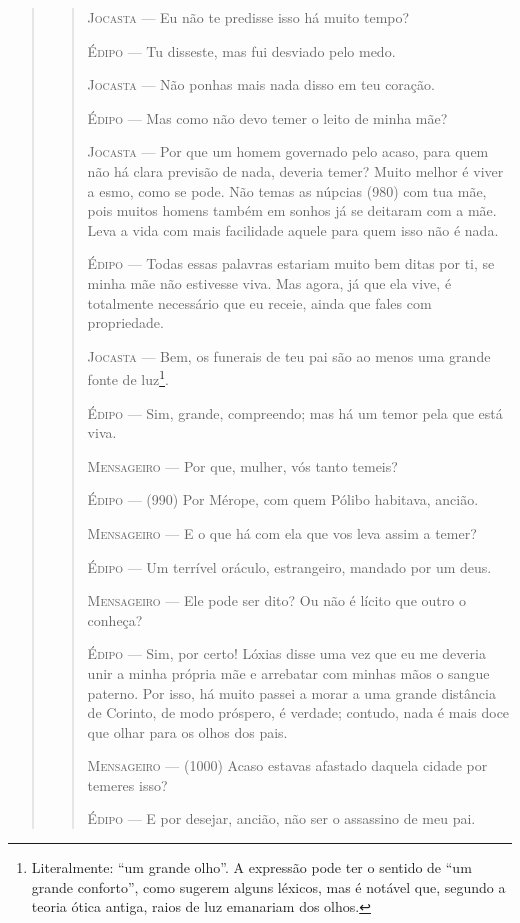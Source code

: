 \begin{verse}
\begin{verse}
\textsc{Jocasta} --- Eu não te predisse isso há muito tempo?

\textsc{Édipo} --- Tu disseste, mas fui desviado pelo medo.

\textsc{Jocasta} --- Não ponhas mais nada disso em teu coração.

\textsc{Édipo} --- Mas como não devo temer o leito de minha mãe?

\textsc{Jocasta} --- Por que um homem governado pelo acaso, para quem não há clara previsão
de nada, deveria temer? Muito melhor é viver a esmo, como se pode. Não
temas as núpcias (980) com tua mãe, pois muitos homens também em sonhos
já se deitaram com a mãe. Leva a vida com mais facilidade aquele para
quem isso não é nada.

\textsc{Édipo} --- Todas essas palavras estariam muito bem ditas por ti, se minha mãe não
estivesse viva. Mas agora, já que ela vive, é totalmente necessário que
eu receie, ainda que fales com propriedade.

\textsc{Jocasta} --- Bem, os funerais de teu pai são ao menos uma grande fonte de
luz\footnote{Literalmente: ``um grande olho''. A expressão pode ter o
  sentido de ``um grande conforto'', como sugerem alguns léxicos, mas é
  notável que, segundo a teoria ótica antiga, raios de luz emanariam dos
  olhos.}.

\textsc{Édipo} --- Sim, grande, compreendo; mas há um temor pela que está viva.

\textsc{Mensageiro} --- Por que, mulher, vós tanto temeis?

\textsc{Édipo} --- (990) Por Mérope, com quem Pólibo habitava, ancião.

\textsc{Mensageiro} --- E o que há com ela que vos leva assim a temer?

\textsc{Édipo} --- Um terrível oráculo, estrangeiro, mandado por um deus.

\textsc{Mensageiro} --- Ele pode ser dito? Ou não é lícito que outro o conheça?

\textsc{Édipo} --- Sim, por certo! Lóxias disse uma vez que eu me deveria unir a minha
própria mãe e arrebatar com minhas mãos o sangue paterno. Por isso, há
muito passei a morar a uma grande distância de Corinto, de modo
próspero, é verdade; contudo, nada é mais doce que olhar para os olhos
dos pais.

\textsc{Mensageiro} --- (1000) Acaso estavas afastado daquela cidade por temeres isso?

\textsc{Édipo} --- E por desejar, ancião, não ser o assassino de meu pai.


\end{verse}
\end{verse}
